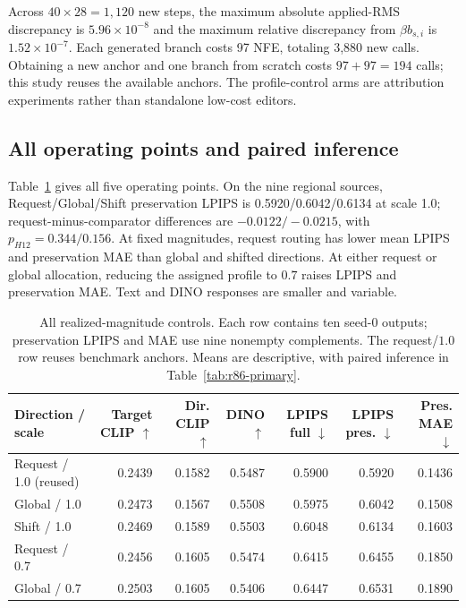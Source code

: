 Across $40\times28=1,120$ new steps, the maximum absolute applied-RMS discrepancy is $5.96\times10^{-8}$ and the maximum relative discrepancy from $\beta b_{s,i}$ is $1.52\times10^{-7}$. Each generated branch costs 97 NFE, totaling 3,880 new calls. Obtaining a new anchor and one branch from scratch costs $97+97=194$ calls; this study reuses the available anchors. The profile-control arms are attribution experiments rather than standalone low-cost editors.

\subsection{All operating points and paired inference}
Table~\ref{tab:r86-means} gives all five operating points. On the nine regional sources, Request/Global/Shift preservation LPIPS is 0.5920/0.6042/0.6134 at scale 1.0; request-minus-comparator differences are $-0.0122/-0.0215$, with $p_{H12}=0.344/0.156$. At fixed magnitudes, request routing has lower mean LPIPS and preservation MAE than global and shifted directions. At either request or global allocation, reducing the assigned profile to $0.7$ raises LPIPS and preservation MAE. Text and DINO responses are smaller and variable.

\begin{table}[t]
\centering\small
\caption{All realized-magnitude controls. Each row contains ten seed-0 outputs; preservation LPIPS and MAE use nine nonempty complements. The request/$1.0$ row reuses benchmark anchors. Means are descriptive, with paired inference in Table~\ref{tab:r86-primary}.}
\label{tab:r86-means}
\setlength{\tabcolsep}{4pt}
\begin{tabular}{lrrrrrr}
\toprule
Direction / scale & Target CLIP $\uparrow$ & Dir. CLIP $\uparrow$ & DINO $\uparrow$ & LPIPS full $\downarrow$ & LPIPS pres. $\downarrow$ & Pres. MAE $\downarrow$\\
\midrule
Request / 1.0 (reused) & 0.2439 & 0.1582 & 0.5487 & 0.5900 & 0.5920 & 0.1436\\
Global / 1.0 & 0.2473 & 0.1567 & 0.5508 & 0.5975 & 0.6042 & 0.1508\\
Shift / 1.0 & 0.2469 & 0.1589 & 0.5503 & 0.6048 & 0.6134 & 0.1603\\
Request / 0.7 & 0.2456 & 0.1605 & 0.5474 & 0.6415 & 0.6455 & 0.1850\\
Global / 0.7 & 0.2503 & 0.1605 & 0.5406 & 0.6447 & 0.6531 & 0.1890\\
\bottomrule\end{tabular}\end{table}

